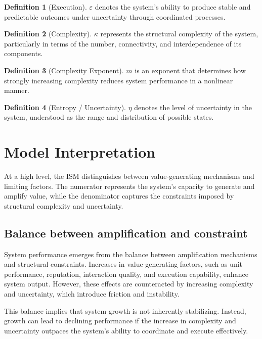 \documentclass[11pt,a4paper]{article}
\theoremstyle{definition}
\newtheorem{definition}{Definition}[section]
\begin{document}
\begin{definition}[Execution]
\label{def:execution}
$\varepsilon$ denotes the system's ability to produce stable and predictable outcomes under uncertainty through coordinated processes.
\end{definition}

\begin{definition}[Complexity]
\label{def:complexity}
$\kappa$ represents the structural complexity of the system, particularly in terms of the number, connectivity, and interdependence of its components.
\end{definition}

\begin{definition}[Complexity Exponent]
\label{def:complexity_exponent}
$m$ is an exponent that determines how strongly increasing complexity reduces system performance in a nonlinear manner.
\end{definition}

\begin{definition}[Entropy / Uncertainty]
\label{def:entropy}
$\eta$ denotes the level of uncertainty in the system, understood as the range and distribution of possible states.
\end{definition}


\section{Model Interpretation}
\label{sec:interpretation}

At a high level, the \ac{ISM} distinguishes between value-generating mechanisms and limiting factors.
The numerator represents the system's capacity to generate and amplify value, while the denominator captures the constraints imposed by structural complexity and uncertainty.

\subsection{Balance between amplification and constraint}
\label{subsec:balance}

System performance emerges from the balance between amplification mechanisms and structural constraints.
Increases in value-generating factors, such as unit performance, reputation, interaction quality, and execution capability, enhance system output.
However, these effects are counteracted by increasing complexity and uncertainty, which introduce friction and instability.

This balance implies that system growth is not inherently stabilizing.
Instead, growth can lead to declining performance if the increase in complexity and uncertainty outpaces the system's ability to coordinate and execute effectively.
\end{document}
